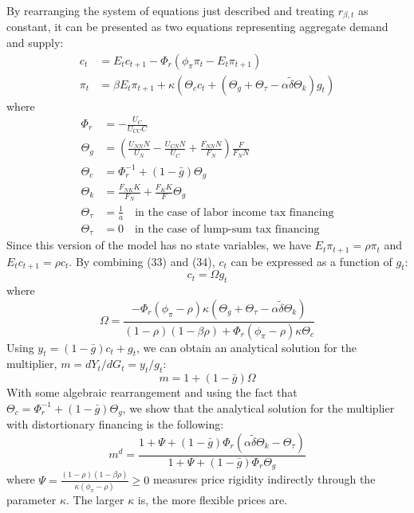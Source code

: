 \documentclass[12pt,letterpaper]{article}
\newcommand{\Et}{E_t}
\newcommand{\gbar}{\bar{g}}
\newcommand{\dtilde}{\tilde{\delta}}
\newcommand{\Theg}{\Theta_g}
\newcommand{\Thec}{\Theta_c}
\newcommand{\Thek}{\Theta_k}
\newcommand{\Thet}{\Theta_\tau}
\newcommand{\Phir}{\Phi_r}
\begin{document}
By rearranging the system of equations just described and treating $r_{\beta,t}$ as constant, it can be presented as two equations representing aggregate demand and supply:
\begin{align}
c_t &= \Et c_{t+1} - \Phir(\phi_\pi\pi_t - \Et\pi_{t+1}) \tag{33}\\
\pi_t &= \beta\Et\pi_{t+1} + \kappa\left(\Thec c_t + (\Theg + \Thet - \alpha\dtilde\Thek)g_t\right) \tag{34}
\end{align}
where
\begin{align}
\Phir &= -\frac{U_C}{U_{CC}C} \tag{35}\\
\Theg &= \left(\frac{U_{NN}N}{U_N} - \frac{U_{CN}N}{U_C} + \frac{F_{NN}N}{F_N}\right)\frac{F}{F_N N} \tag{36}\\
\Thec &= \Phir^{-1} + (1-\gbar)\Theg \tag{37}\\
\Thek &= \frac{F_{NK}K}{F_N} + \frac{F_K K}{F}\Theg \tag{38}\\
\Thet &= \frac{1}{a} \quad \text{in the case of labor income tax financing} \tag{39}\\
\Thet &= 0 \quad \text{in the case of lump-sum tax financing} \tag{40}
\end{align}
Since this version of the model has no state variables, we have $\Et\pi_{t+1} = \rho\pi_t$ and $\Et c_{t+1} = \rho c_t$. By combining (33) and (34), $c_t$ can be expressed as a function of $g_t$:
\begin{equation}
c_t = \Omega g_t \tag{41}
\end{equation}
where
\begin{equation}
\Omega = \frac{-\Phir(\phi_\pi-\rho)\kappa\left(\Theg + \Thet - \alpha\dtilde\Thek\right)}{(1-\rho)(1-\beta\rho) + \Phir(\phi_\pi-\rho)\kappa\Thec} \tag{42}
\end{equation}
Using $y_t = (1-\gbar)c_t + g_t$, we can obtain an analytical solution for the multiplier, $m = dY_t/dG_t = y_t/g_t$:
\begin{equation}
m = 1 + (1-\gbar)\Omega \tag{43}
\end{equation}
With some algebraic rearrangement and using the fact that $\Thec = \Phir^{-1} + (1-\gbar)\Theg$, we show that the analytical solution for the multiplier with distortionary financing is the following:
\begin{equation}
m^d = \frac{1 + \Psi + (1-\gbar)\Phir\left(\alpha\dtilde\Thek - \Thet\right)}{1 + \Psi + (1-\gbar)\Phir\Theg} \tag{44}
\end{equation}
where $\Psi = \frac{(1-\rho)(1-\beta\rho)}{\kappa(\phi_\pi-\rho)} \geq 0$ measures price rigidity indirectly through the parameter $\kappa$. The larger $\kappa$ is, the more flexible prices are.
\end{document}
